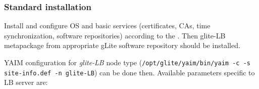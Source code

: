 \subsubsection{Standard installation}

Install and configure OS and basic services (certificates, CAs, time synchronization, software repositories) according to the . Then glite-LB metapackage from appropriate gLite software repository should be installed.

YAIM configuration for \emph{glite-LB} node type 
(\texttt{/opt/glite/yaim/bin/yaim -c -s site-info.def -n glite-LB}) 
can be done then. Available parameters specific to LB server are:

